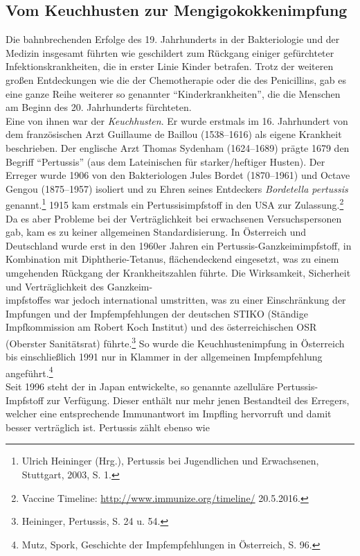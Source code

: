 \documentclass[
    a4paper,
    12pt,
    hyphens,
    chapterprefix=true,
    headheight=33pt,
    footheight=29pt,
    headings=optiontohead,
]{scrartcl}
\begin{document}
\subsection{Vom Keuchhusten zur Mengigokokkenimpfung}
Die bahnbrechenden Erfolge des 19. Jahrhunderts in der Bakteriologie und der Medizin insgesamt führten wie geschildert zum Rückgang einiger gefürchteter Infektionskrankheiten, die in erster Linie Kinder betrafen. Trotz der weiteren großen Entdeckungen wie die der Chemotherapie oder die des Penicillins, gab es eine ganze Reihe weiterer so genannter "`Kinderkrankheiten"', die die Menschen am Beginn des 20. Jahrhunderts fürchteten.\\
Eine von ihnen war der \textit{Keuchhusten}. Er wurde erstmals im 16. Jahrhundert von dem französischen Arzt Guillaume de Baillou (1538--1616) als eigene Krankheit beschrieben. Der englische Arzt Thomas Sydenham (1624--1689) prägte 1679 den Begriff "`Pertussis"' (aus dem Lateinischen für starker/heftiger Husten). Der Erreger wurde 1906 von den Bakteriologen Jules Bordet (1870--1961) und Octave Gengou (1875--1957) isoliert und zu Ehren seines Entdeckers \textit{Bordetella pertussis} genannt.\footnote{Ulrich Heininger (Hrg.), Pertussis bei Jugendlichen und Erwachsenen, Stuttgart, 2003, S. 1.} 1915 kam erstmals ein Pertussisimpfstoff in den USA zur Zulassung.\footnote{Vaccine Timeline: \url{http://www.immunize.org/timeline/} 20.5.2016.} Da es aber Probleme bei der Verträglichkeit bei erwachsenen Versuchspersonen gab, kam es zu keiner allgemeinen Standardisierung. In Österreich und Deutschland wurde erst in den 1960er Jahren ein Pertussis-Ganzkeimimpfstoff, in Kombination mit Diphtherie-Tetanus, flächendeckend eingesetzt, was zu einem umgehenden Rückgang der Krankheitszahlen führte. Die Wirksamkeit, Sicherheit und Verträglichkeit des Ganzkeim-\\impfstoffes war jedoch international umstritten, was zu einer Einschränkung der Impfungen und der Impfempfehlungen der deutschen STIKO (Ständige Impfkommission am Robert Koch Institut) und des österreichischen OSR (Oberster Sanitätsrat) führte.\footnote{Heininger, Pertussis, S. 24 u. 54.} So wurde die Keuchhustenimpfung in Österreich bis einschließlich 1991 nur in Klammer in der allgemeinen Impfempfehlung angeführt.\footnote{Mutz, Spork, Geschichte der Impfempfehlungen in Österreich, S. 96.} \\
Seit 1996 steht der in Japan entwickelte, so genannte azelluläre Pertussis-Impfstoff zur Verfügung. Dieser enthält nur mehr jenen Bestandteil
des Erregers, welcher eine entsprechende Immunantwort im Impfling hervorruft und damit besser verträglich ist. Pertussis zählt ebenso wie
\end{document}
